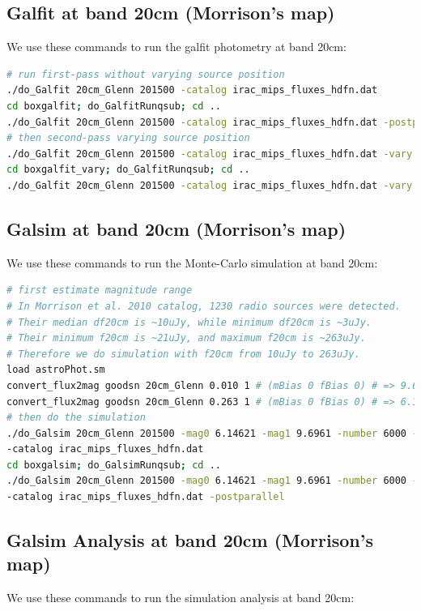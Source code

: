 \documentclass[11pt,a4paper]{article}
\begin{document}
\subsection{Galfit at band 20cm (Morrison's map)}

We use these commands to run the galfit photometry at band 20cm:

\begin{lstlisting}[language=bash]
# run first-pass without varying source position
./do_Galfit 20cm_Glenn 201500 -catalog irac_mips_fluxes_hdfn.dat
cd boxgalfit; do_GalfitRunqsub; cd ..
./do_Galfit 20cm_Glenn 201500 -catalog irac_mips_fluxes_hdfn.dat -postparallel
# then second-pass varying source position
./do_Galfit 20cm_Glenn 201500 -catalog irac_mips_fluxes_hdfn.dat -vary
cd boxgalfit_vary; do_GalfitRunqsub; cd ..
./do_Galfit 20cm_Glenn 201500 -catalog irac_mips_fluxes_hdfn.dat -vary -postparallel
\end{lstlisting}

\subsection{Galsim at band 20cm (Morrison's map)}

We use these commands to run the Monte-Carlo simulation at band 20cm:

\begin{lstlisting}[language=bash]
# first estimate magnitude range
# In Morrison et al. 2010 catalog, 1230 radio sources were detected. 
# Their median df20cm is ~10uJy, while minimum df20cm is ~3uJy. 
# Their minimum f20cm is ~21uJy, and maximum f20cm is ~263uJy. 
# Therefore we do simulation with f20cm from 10uJy to 263uJy. 
load astroPhot.sm
convert_flux2mag goodsn 20cm_Glenn 0.010 1 # (mBias 0 fBias 0) # => 9.6961
convert_flux2mag goodsn 20cm_Glenn 0.263 1 # (mBias 0 fBias 0) # => 6.14621
# then do the simulation
./do_Galsim 20cm_Glenn 201500 -mag0 6.14621 -mag1 9.6961 -number 6000 -vary \
-catalog irac_mips_fluxes_hdfn.dat
cd boxgalsim; do_GalsimRunqsub; cd ..
./do_Galsim 20cm_Glenn 201500 -mag0 6.14621 -mag1 9.6961 -number 6000 -vary \
-catalog irac_mips_fluxes_hdfn.dat -postparallel
\end{lstlisting}

\subsection{Galsim Analysis at band 20cm (Morrison's map)}

We use these commands to run the simulation analysis at band 20cm:
\end{document}
